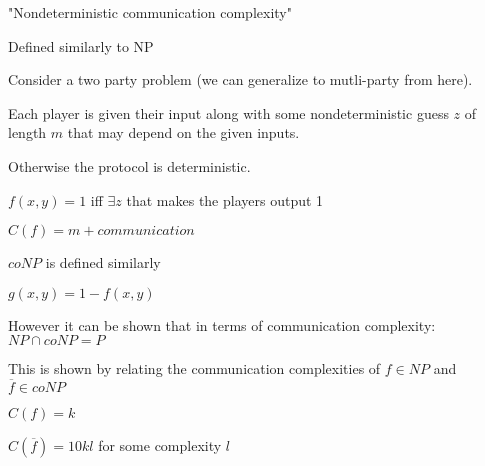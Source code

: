 \documentclass[12pt]{article}
\begin{document}
\maketitle

\par{"Nondeterministic communication complexity"}
\\

\par{Defined similarly to NP}
\\

\par{Consider a two party problem (we can generalize to mutli-party from here).}
\\

\par{Each player is given their input along with some nondeterministic guess $z$ of length $m$ that may depend on the
given inputs.}
\\

\par{Otherwise the protocol is deterministic.}
\\

\par{$f(x, y) = 1$ iff $\exists z$ that makes the players output 1}
\\

\par{$C(f) = m + communication$}
\\

\par{$coNP$ is defined similarly}
\\

\par{$g(x, y) = 1 - f(x, y)$}
\\

\par{However it can be shown that in terms of communication complexity: $NP \cap coNP = P$}
\\

\par{This is shown by relating the communication complexities of $f \in NP$ and $\overline{f} \in coNP$}
\par{$C(f) = k$}
\par{$C(\overline{f}) = 10kl$ for some complexity $l$}
\end{document}
